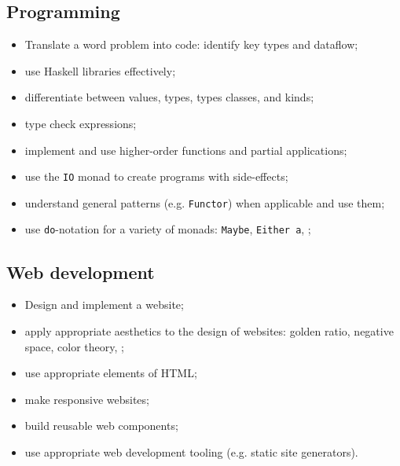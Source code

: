 \documentclass[11pt]{article}
\newcommand{\code}{\texttt}
\begin{document}
\subsection*{Programming}

\begin{itemize}
  \item Translate a word problem into code: identify key types and dataflow;
  \item use Haskell libraries effectively;
  \item differentiate between values, types, types classes, and kinds;
  \item type check expressions;
  \item implement and use higher-order functions and partial applications;
  \item use the \code{IO} monad to create programs with side-effects;
  \item understand general patterns (e.g. \code{Functor}) when applicable and
    use them;
  \item
    use \code{do}-notation for a variety of monads:
    \code{Maybe}, \code{Either a}, \textellipsis;
\end{itemize}

\subsection*{Web development}

\begin{itemize}
  \item Design and implement a website;
  \item apply appropriate aesthetics to the design of websites:
    golden ratio, negative space, color theory, \textellipsis;
  \item use appropriate elements of HTML;
  \item make responsive websites;
  \item build reusable web components;
  \item use appropriate web development tooling (e.g. static site generators).
\end{itemize}
\end{document}
